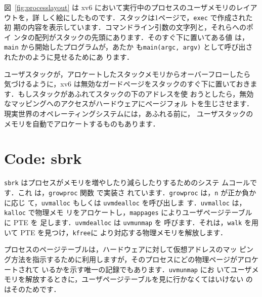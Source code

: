図~\ref{fig:processlayout} は xv6 において実行中のプロセスのユーザメモリのレイアウトを，詳
しく絵にしたものです．スタックは1ページで，\lstinline{exec} で作成された初
期の内容を表示しています．コマンドライン引数の文字列と，それらへのポイ
ンタの配列がスタックの先頭にあります．そのすぐ下に置いてある値
は，\lstinline{main} から開始したプログラムが，あたか
も\lstinline{main(argc, argv)} として呼び出されたかのように見せるためにあ
ります．

ユーザスタックが，アロケートしたスタックメモリからオーバーフローしたら
気づけるように，xv6 は無効なガードページをスタックのすぐ下に置いておきま
す．もしスタックがあふれてスタックの下のアドレスを使
おうとしたら，無効なマッピングへのアクセスがハードウェアにページフォル
トを生じさせます．現実世界のオペレーティングシステムには，あふれる前に，
ユーザスタックのメモリを自動でアロケートするものもあります．

\section{Code: sbrk}

\lstinline{sbrk} はプロセスがメモリを増やしたり減らしたりするためのシステ
ムコールです．これ
は，\lstinline{growproc} 関数  で実装さ
れています．\lstinline{growproc} は，\lstinline{n} が正か負かに応じ
て，\lstinline{uvmalloc} もしくは \lstinline{uvmdealloc} を呼び出しま
す．\lstinline{uvmalloc}  は，\lstinline{kalloc} で物理メモ
リをアロケートし，\lstinline{mappages} によりユーザページテーブルに PTE を
足します．\lstinline{uvmdealloc} は \lstinline{uvmunmap}  を
呼びます．それは，\lstinline{walk} を用いて PTE を見つけ，\lstinline{kfree}に
より対応する物理メモリを解放します．

プロセスのページテーブルは，ハードウェアに対して仮想アドレスのマッ
ピング方法を指示するために利用しますが，そのプロセスにどの物理ページがアロケートされて
いるかを示す唯一の記録でもあります．\texttt{uvmunmap} にお
いてユーザメモリを解放するときに，ユーザページテーブルを見に行かなくてはいけない
のはそのためです．


